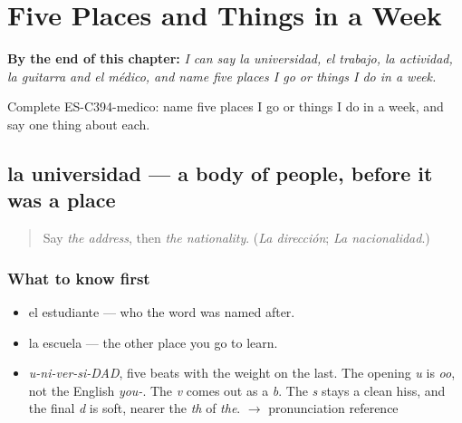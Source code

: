 
\chapter{Five Places and Things in a Week}
\label{ch:la-universidad-y-el-trabajo}

\begin{chapteropening}
\textbf{By the end of this chapter:} \emph{I can say la universidad, el trabajo, la actividad, la guitarra and el médico, and name five places I go or things I do in a week.}

Complete ES-C394-medico: name five places I go or things I do in a week, and say one thing about each.
\end{chapteropening}

\section[la universidad]{la universidad — a body of people, before it was a place}

\label{lesson:ES-C394-universidad}



\begin{quote}
Say \emph{the address}, then \emph{the nationality}. (\emph{La dirección}; \emph{La nacionalidad}.)
\end{quote}

\subsection*{What to know first}
\begin{itemize}
\raggedright
  \item el estudiante — who the word was named after.
  \item la escuela — the other place you go to learn.
\end{itemize}

\begin{sounds}
\begin{itemize}
\raggedright
  \item \emph{u-ni-ver-si-DAD}, five beats with the weight on the last. The opening \emph{u} is \emph{oo}, not the English \emph{you-}. The \emph{v} comes out as a \emph{b}. The \emph{s} stays a clean hiss, and the final \emph{d} is soft, nearer the \emph{th} of \emph{the}. $\to$ pronunciation reference
\end{itemize}
\end{sounds}

